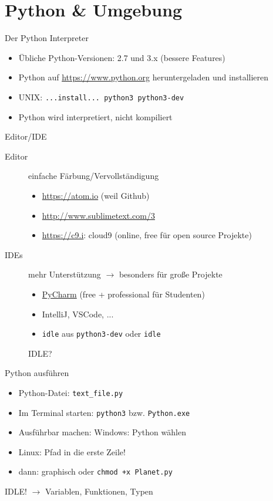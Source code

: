 \section{Python \& Umgebung}
\begin{frame}{Der Python Interpreter}
	\begin{itemize}
		\item Übliche Python-Versionen: 2.7 und 3.x (bessere Features)
		\item Python auf \url{https://www.python.org} heruntergeladen und installieren
		\item UNIX: \texttt{...install... python3 python3-dev}
		\item<2-> Python wird interpretiert, nicht kompiliert
	\end{itemize}
\end{frame}
\begin{frame}{Editor/IDE}
	\begin{description}
		\item[Editor] einfache Färbung/Vervollständigung
		\begin{itemize}
			\item \url{https://atom.io} (weil Github)
			\item \url{http://www.sublimetext.com/3}
			\item \url{https://c9.i}: cloud9 (online, free für open source Projekte)
		\end{itemize}
		\item[IDEs] mehr Unterstützung $\to$ besonders für große Projekte
		\begin{itemize}
			\item \href{https://jetbrains.com/pycharm}{PyCharm} (free + professional für Studenten)
			\item IntelliJ, VSCode, ...
			\item \texttt{idle} aus \texttt{python3-dev} oder \texttt{idle}
		\end{itemize}
		
		IDLE?
	\end{description}
\end{frame}
\begin{frame}{Python ausführen}
	\begin{itemize}
		\item Python-Datei: \texttt{text\_file.py}
		\item Im Terminal starten: \texttt{python3} bzw. \texttt{Python.exe}
		\item Ausführbar machen: Windows: Python wählen
		\item Linux: Pfad in die erste Zeile!
		\item dann: graphisch oder \texttt{chmod +x Planet.py}
	\end{itemize}
	
	IDLE! $\to$ Variablen, Funktionen, Typen
\end{frame}

